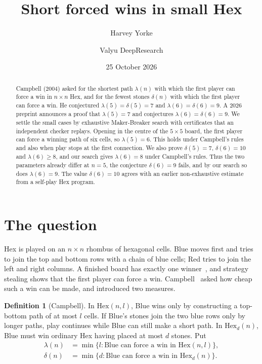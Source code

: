 \documentclass[11pt]{amsart}
\title{Short forced wins in small Hex}
\author{Harvey Yorke}
\author{Valyu DeepResearch}
\date{25 October 2026}
\theoremstyle{definition}
\newtheorem{definition}[theorem]{Definition}
\theoremstyle{remark}
\newcommand{\Hex}{\mathrm{Hex}}
\begin{document}
\raggedbottom
\begin{abstract}
Campbell (2004) asked for the shortest path $\lambda(n)$ with which the first player can force a win in $n\times n$ Hex, and for the fewest stones $\delta(n)$ with which the first player can force a win. He conjectured $\lambda(5)=\delta(5)=7$ and $\lambda(6)=\delta(6)=9$. A 2026 preprint announces a proof that $\lambda(5)=7$ and conjectures $\lambda(6)=\delta(6)=9$. We settle the small cases by exhaustive Maker-Breaker search with certificates that an independent checker replays. Opening in the centre of the $5\times5$ board, the first player can force a winning path of six cells, so $\lambda(5)=6$. This holds under Campbell's rules and also when play stops at the first connection. We also prove $\delta(5)=7$, $\delta(6)=10$ and $\lambda(6)\ge8$, and our search gives $\lambda(6)=8$ under Campbell's rules. Thus the two parameters already differ at $n=5$, the conjecture $\delta(6)=9$ fails, and by our search so does $\lambda(6)=9$. The value $\delta(6)=10$ agrees with an earlier non-exhaustive estimate from a self-play Hex program.
\end{abstract}
\maketitle

\section{The question}

Hex is played on an $n\times n$ rhombus of hexagonal cells. Blue moves first and tries to join the top and bottom rows with a chain of blue cells; Red tries to join the left and right columns. A finished board has exactly one winner~\cite{Gale1979}, and strategy stealing shows that the first player can force a win. Campbell~\cite{Campbell2004} asked how cheap such a win can be made, and introduced two measures.

\begin{definition}[Campbell]\label{def:games}
In $\Hex(n,l)$, Blue wins only by constructing a top-bottom path of at most $l$ cells. If Blue's stones join the two blue rows only by longer paths, play continues while Blue can still make a short path. In $\Hex_d(n)$, Blue must win ordinary Hex having placed at most $d$ stones. Put
\begin{align*}
\lambda(n)&=\min\{l:\text{Blue can force a win in }\Hex(n,l)\},\\
\delta(n)&=\min\{d:\text{Blue can force a win in }\Hex_d(n)\}.
\end{align*}
\end{definition}
\end{document}
